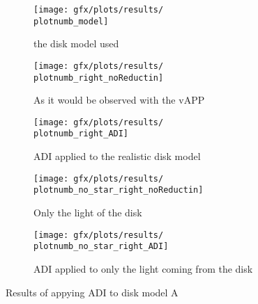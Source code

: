 \begin{figure}[h!]
  \newcommand{\plotnumb}{0}
  \begin{subfigure}[b]{0.6\textwidth}
    \texttt{[image: gfx/plots/results/\\plotnumb\_model]}
    \caption{the disk model used}
  \end{subfigure}
  
  \begin{subfigure}[b]{0.6\textwidth}
    \texttt{[image: gfx/plots/results/\\plotnumb\_right\_noReductin]}
    \caption{As it would be observed with the \ac{vAPP}}
  \end{subfigure}%
  \begin{subfigure}[b]{0.6\textwidth}
    \texttt{[image: gfx/plots/results/\\plotnumb\_right\_ADI]}
    \caption{\ac{ADI} applied to the realistic disk model}
  \end{subfigure}
  
  \begin{subfigure}[t]{0.6\textwidth}
    \centering
    \texttt{[image: gfx/plots/results/\\plotnumb\_no\_star\_right\_noReductin]}
    \caption{Only the light of the disk}
  \end{subfigure}%
  \begin{subfigure}[t]{0.6\textwidth}
    \centering
    \texttt{[image: gfx/plots/results/\\plotnumb\_no\_star\_right\_ADI]}
    \caption{\ac{ADI} applied to only the light coming from the disk}
  \end{subfigure}


  \caption{Results of appying \ac{ADI} to disk model A}
  \label{fig:A}
\end{figure}

